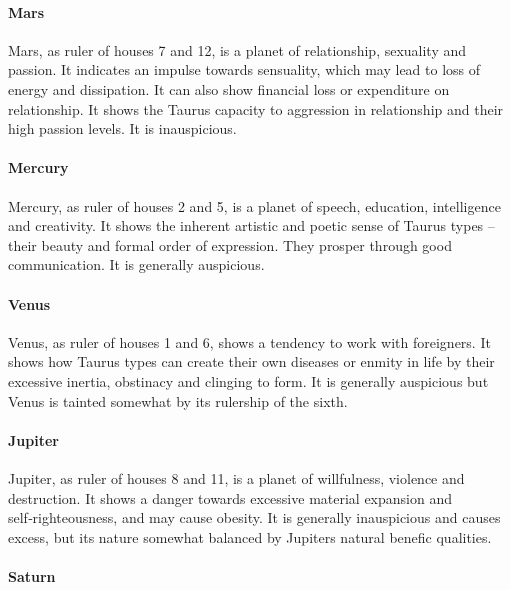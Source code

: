  

\paragraph{Mars}

Mars, as ruler of houses 7 and 12, is a planet of relationship, sexuality and passion. It indicates an impulse towards sensuality, which may lead to loss of energy and dissipation. It can also show financial loss or expenditure on relationship. It shows the Taurus capacity to aggression in relationship and their high passion levels. It is inauspicious.

 

\paragraph{Mercury}

Mercury, as ruler of houses 2 and 5, is a planet of speech, education, intelligence and creativity. It shows the inherent artistic and poetic sense of Taurus types – their beauty and formal order of expression. They prosper through good communication. It is generally auspicious.

 

\paragraph{Venus}

Venus, as ruler of houses 1 and 6, shows a tendency to work with foreigners. It shows how Taurus types can create their own diseases or enmity in life by their excessive inertia, obstinacy and clinging to form. It is generally auspicious but Venus is tainted somewhat by its rulership of the sixth.

 

\paragraph{Jupiter}

Jupiter, as ruler of houses 8 and 11, is a planet of willfulness, violence and destruction. It shows a danger towards excessive material expansion and self‑righteousness, and may cause obesity. It is generally inauspicious and causes excess, but its nature somewhat balanced by Jupiters natural benefic qualities.

 

\paragraph{Saturn}

